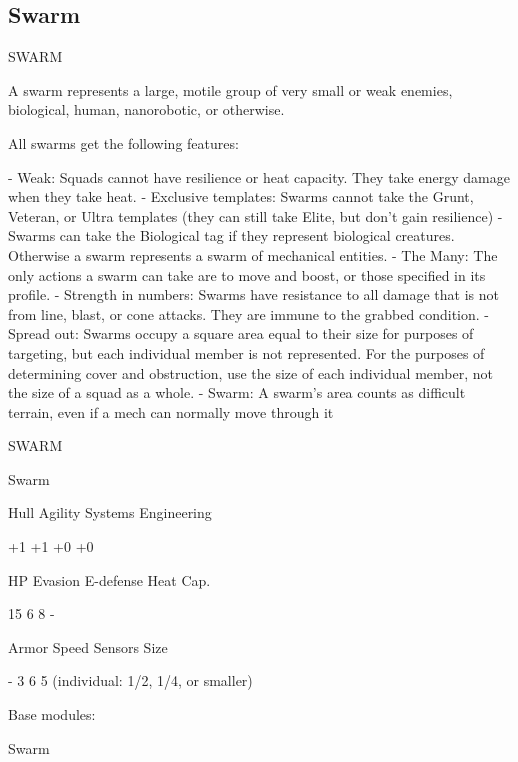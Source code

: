 \subsection{Swarm}
                                                   SWARM  

A swarm represents a large, motile group of very small or weak enemies, biological, human,  
nanorobotic, or otherwise.  

All swarms get the following features:
 
    -    Weak: Squads cannot have resilience or heat capacity. They take energy damage when  
         they take heat.  
    -    Exclusive templates: Swarms cannot take the Grunt, Veteran, or Ultra templates (they  
         can still take Elite, but don’t gain resilience)  
    -    Swarms can take the Biological tag if they represent biological creatures. Otherwise a  
         swarm represents a swarm of mechanical entities.  
    -    The Many: The only actions a swarm can take are to move and boost, or those specified  
         in its profile.  
    -    Strength in numbers: Swarms have resistance to all damage that is not from line, blast,  
         or cone attacks. They are immune to the grabbed condition.  
    -    Spread out: Swarms occupy a square area equal to their size for purposes of targeting,  
         but each individual member is not represented. For the purposes of determining cover  
         and obstruction, use the size of each individual member, not the size of a squad as a  
         whole.  
    -    Swarm: A swarm’s area counts as difficult terrain, even if a mech can normally move  
         through it  

       SWARM 

       Swarm 

       Hull       Agility      Systems       Engineering 

       +1         +1           +0            +0 

       HP         Evasion      E-defense     Heat Cap. 

       15         6            8             - 

       Armor      Speed        Sensors       Size 

       -          3            6             5 (individual:  
                                             1/2, 1/4, or  
                                             smaller) 

Base modules:
 
Swarm
 
